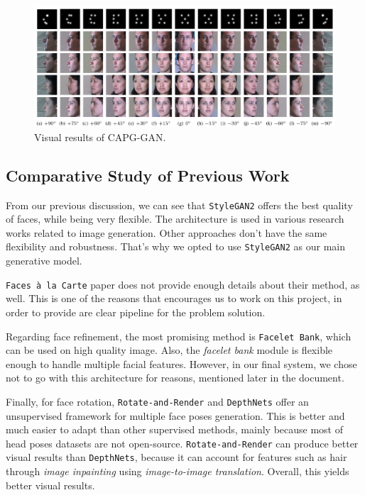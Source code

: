 \begin{figure}[H]
    \centering
    \includegraphics[width=\textwidth]{images/capg-gan.png}
    \caption{Visual results of CAPG-GAN.}
    \label{fig:capg}
\end{figure}

\subsection{Comparative Study of Previous Work}
From our previous discussion, we can see that \texttt{StyleGAN2} offers the best quality of faces, while being very flexible. The architecture is used in various research works related to image generation. Other approaches don't have the same flexibility and robustness. That's why we opted to use \texttt{StyleGAN2} as our main generative model. 

\texttt{Faces à la Carte} paper does not provide enough details about their method, as well. This is one of the reasons that encourages us to work on this project, in order to provide are clear pipeline for the problem solution.

Regarding face refinement, the most promising method is \texttt{Facelet Bank}, which can be used on high quality image. Also, the \emph{facelet bank} module is flexible enough to handle multiple facial features. However, in our final system, we chose not to go with this architecture for reasons, mentioned later in the document.

Finally, for face rotation, \texttt{Rotate-and-Render} and \texttt{DepthNets} offer an unsupervised framework for multiple face poses generation. This is better and much easier to adapt than other supervised methods, mainly because most of head poses datasets are not open-source. \texttt{Rotate-and-Render} can produce better visual results than \texttt{DepthNets}, because it can account for features such as hair through \emph{image inpainting} using \emph{image-to-image translation}. Overall, this yields better visual results.

